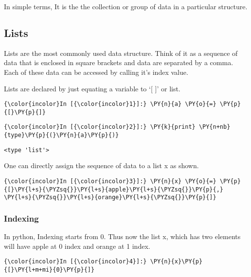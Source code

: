     In simple terms, It is the the collection or group of data in a
particular structure.

    \subsection{Lists}\label{lists}

    Lists are the most commonly used data structure. Think of it as a
sequence of data that is enclosed in square brackets and data are
separated by a comma. Each of these data can be accessed by calling it's
index value.

Lists are declared by just equating a variable to `{[} {]}' or list.

    \begin{Verbatim}[commandchars=\\\{\}]
{\color{incolor}In [{\color{incolor}1}]:} \PY{n}{a} \PY{o}{=} \PY{p}{[}\PY{p}{]}
\end{Verbatim}

    \begin{Verbatim}[commandchars=\\\{\}]
{\color{incolor}In [{\color{incolor}2}]:} \PY{k}{print} \PY{n+nb}{type}\PY{p}{(}\PY{n}{a}\PY{p}{)}
\end{Verbatim}

    \begin{Verbatim}[commandchars=\\\{\}]
<type 'list'>
    \end{Verbatim}

    One can directly assign the sequence of data to a list x as shown.

    \begin{Verbatim}[commandchars=\\\{\}]
{\color{incolor}In [{\color{incolor}3}]:} \PY{n}{x} \PY{o}{=} \PY{p}{[}\PY{l+s}{\PYZsq{}}\PY{l+s}{apple}\PY{l+s}{\PYZsq{}}\PY{p}{,} \PY{l+s}{\PYZsq{}}\PY{l+s}{orange}\PY{l+s}{\PYZsq{}}\PY{p}{]}
\end{Verbatim}

    \subsubsection{Indexing}\label{indexing}

    In python, Indexing starts from 0. Thus now the list x, which has two
elements will have apple at 0 index and orange at 1 index.

    \begin{Verbatim}[commandchars=\\\{\}]
{\color{incolor}In [{\color{incolor}4}]:} \PY{n}{x}\PY{p}{[}\PY{l+m+mi}{0}\PY{p}{]}
\end{Verbatim}


